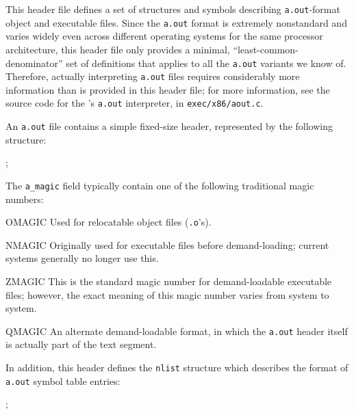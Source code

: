\label{exec-a-out-h}
\begin{apidesc}
	This header file defines a set of structures and symbols
	describing \texttt{a.out}-format object and executable files.
	Since the \texttt{a.out} format is extremely nonstandard
	and varies widely even across different operating systems
	for the same processor architecture,
	this header file only provides
	a minimal, ``least-common-denominator'' set of definitions
	that applies to all the \texttt{a.out} variants we know of.
	Therefore, actually interpreting \texttt{a.out} files
	requires considerably more information
	than is provided in this header file;
	for more information,
	see the source code for the \oskit's \texttt{a.out} interpreter,
	in \texttt{exec/x86/aout.c}.

	An \texttt{a.out} file contains a simple fixed-size header,
	represented by the following structure:

	;

	The \texttt{a_magic} field
	typically contain one of the following traditional magic numbers:
	\begin{icsymlist}
	\item[OMAGIC]
		Used for relocatable object files (\texttt{.o}'s).
	\item[NMAGIC]
		Originally used for executable files
		before demand-loading;
		current systems generally no longer use this.
	\item[ZMAGIC]
		This is the standard magic number
		for demand-loadable executable files;
		however, the exact meaning of this magic number
		varies from system to system.
	\item[QMAGIC]
		An alternate demand-loadable format,
		in which the \texttt{a.out} header itself
		is actually part of the text segment.
	\end{icsymlist}

	In addition, this header defines the \texttt{nlist} structure
	which describes the format of \texttt{a.out} symbol table entries:

	;
\end{apidesc}

